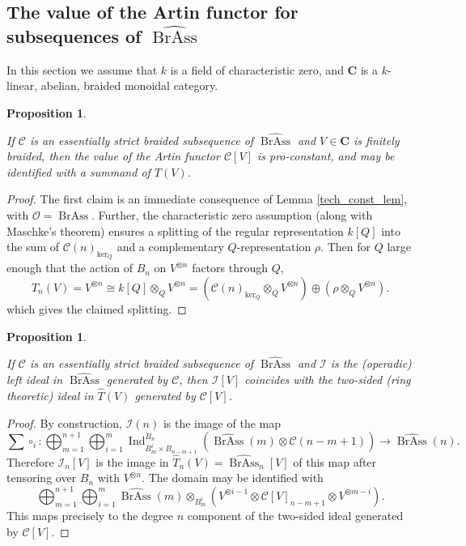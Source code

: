\documentclass[12pt]{article}
\DeclareMathOperator{\Ind}{Ind}
\DeclareMathOperator{\BrAss}{BrAss}
\newcommand{\BrAsshat}{\widehat{\BrAss}} %
\newcommand{\That}{\widehat{T}}
\newcommand{\CC} {\mathcal{C}}
\newcommand{\bC} {\mathbf{C}}
\newcommand{\OO}{\mathcal{O}}
\newcommand{\II}{\mathcal{I}}
\theoremstyle{plain}
\newtheorem{prop}[thm]{Proposition}
\theoremstyle{definition}
\theoremstyle{remark}
\begin{document}
\subsection{The value of the Artin functor for subsequences of $\BrAsshat$}

In this section we assume that $k$ is a field of characteristic zero, and $\bC$ is a $k$-linear, abelian, braided monoidal category.

\begin{prop} \label{subop_prop} 

If $\CC$ is an essentially strict braided subsequence of $\BrAsshat$ and $V \in \bC$ is finitely braided, then the value of the Artin functor $\CC[V]$ is pro-constant, and may be identified with a summand of $T(V)$.

\end{prop}

\begin{proof}

The first claim is an immediate consequence of Lemma \ref{tech_const_lem}, with $\OO = \BrAss$.  Further, the characteristic zero assumption (along with Maschke's theorem) ensures a splitting of the regular representation $k[Q]$ into the sum of $\CC(n)_{\ker_Q}$ and a complementary $Q$-representation $\rho$.  Then for $Q$ large enough that the action of $B_n$ on $V^{\otimes n}$ factors through $Q$,
%
$$T_n (V) =V^{\otimes n} \cong k[Q] \otimes_{Q} V^{\otimes n} =  \left(\CC(n)_{\ker_Q} \otimes_{Q} V^{\otimes n}\right) \oplus (\rho \otimes_{Q} V^{\otimes n}).$$
%
which gives the claimed splitting.

\end{proof}

\begin{prop} \label{ideal_prop} 

If $\CC$ is an essentially strict braided subsequence of $\BrAsshat$ and $\II$ is the (operadic) left ideal in $\BrAsshat$ generated by $\CC$, then $\II[V]$ coincides with the two-sided (ring theoretic) ideal in $\That(V)$ generated by $\CC[V]$. 

\end{prop}

\begin{proof}

By construction, $\II(n)$ is the image of the map
%
$$\sum \circ_i: \bigoplus_{m=1}^{n+1} \bigoplus_{i=1}^m \Ind_{B_m^i \times B_{n-m+1}}^{B_n}(\BrAsshat(m) \otimes \CC(n-m+1)) \to \BrAsshat(n).$$
%
Therefore $\II_n[V]$ is the image in $\That_n(V) = \BrAsshat_n[V]$ of this map after tensoring over $B_n$ with $V^{\otimes n}$. The domain may be identified with
%
$$\bigoplus_{m=1}^{n+1} \bigoplus_{i=1}^m \BrAsshat(m) \otimes_{B_m^i} (V^{\otimes i-1} \otimes  \CC[V]_{n-m+1} \otimes V^{\otimes m-i}).$$
%
This maps precisely to the degree $n$ component of the two-sided ideal generated by $\CC[V]$.

\end{proof}
\end{document}
